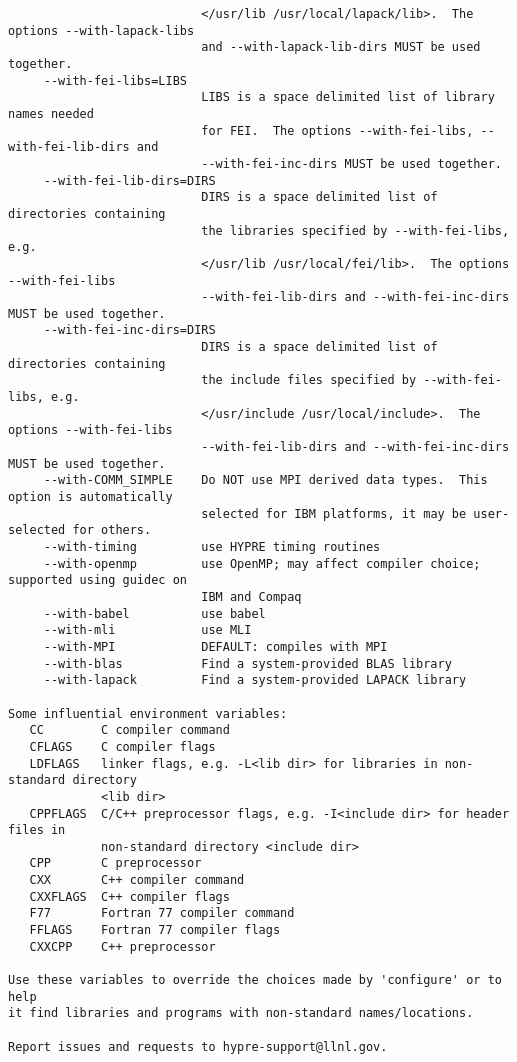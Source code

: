 \begin{verbatim}
                           </usr/lib /usr/local/lapack/lib>.  The options --with-lapack-libs
                           and --with-lapack-lib-dirs MUST be used together.
     --with-fei-libs=LIBS
                           LIBS is a space delimited list of library names needed 
                           for FEI.  The options --with-fei-libs, --with-fei-lib-dirs and 
                           --with-fei-inc-dirs MUST be used together.
     --with-fei-lib-dirs=DIRS
                           DIRS is a space delimited list of directories containing 
                           the libraries specified by --with-fei-libs, e.g.
                           </usr/lib /usr/local/fei/lib>.  The options --with-fei-libs
                           --with-fei-lib-dirs and --with-fei-inc-dirs MUST be used together.
     --with-fei-inc-dirs=DIRS
                           DIRS is a space delimited list of directories containing 
                           the include files specified by --with-fei-libs, e.g.
                           </usr/include /usr/local/include>.  The options --with-fei-libs
                           --with-fei-lib-dirs and --with-fei-inc-dirs MUST be used together.
     --with-COMM_SIMPLE    Do NOT use MPI derived data types.  This option is automatically
                           selected for IBM platforms, it may be user-selected for others.
     --with-timing         use HYPRE timing routines
     --with-openmp         use OpenMP; may affect compiler choice; supported using guidec on
                           IBM and Compaq
     --with-babel          use babel
     --with-mli            use MLI
     --with-MPI            DEFAULT: compiles with MPI
     --with-blas           Find a system-provided BLAS library
     --with-lapack         Find a system-provided LAPACK library

Some influential environment variables:
   CC        C compiler command
   CFLAGS    C compiler flags
   LDFLAGS   linker flags, e.g. -L<lib dir> for libraries in non-standard directory 
             <lib dir>
   CPPFLAGS  C/C++ preprocessor flags, e.g. -I<include dir> for header files in
             non-standard directory <include dir>
   CPP       C preprocessor
   CXX       C++ compiler command
   CXXFLAGS  C++ compiler flags
   F77       Fortran 77 compiler command
   FFLAGS    Fortran 77 compiler flags
   CXXCPP    C++ preprocessor

Use these variables to override the choices made by 'configure' or to help
it find libraries and programs with non-standard names/locations.

Report issues and requests to hypre-support@llnl.gov.
\end{verbatim}

